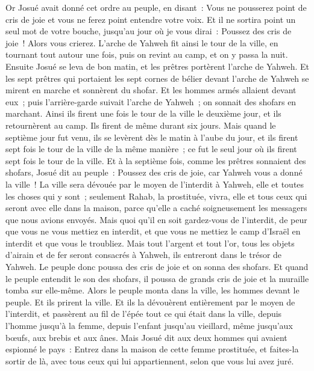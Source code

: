 \begin{multicols}{2}
Or Josué avait donné cet ordre au peuple, en disant~: Vous ne pousserez point de cris de joie et vous ne ferez point entendre votre voix. Et il ne sortira point un seul mot de votre bouche, jusqu'au jour où je vous dirai~: Poussez des cris de joie~! Alors vous crierez.
L'arche de Yahweh fit ainsi le tour de la ville, en tournant tout autour une fois, puis on revint au camp, et on y passa la nuit.
Ensuite Josué se leva de bon matin, et les prêtres portèrent l'arche de Yahweh.
Et les sept prêtres qui portaient les sept cornes de bélier devant l'arche de Yahweh se mirent en marche et sonnèrent du shofar. Et les hommes armés allaient devant eux~; puis l'arrière-garde suivait l'arche de Yahweh~; on sonnait des shofars en marchant.
Ainsi ils firent une fois le tour de la ville le deuxième jour, et ils retournèrent au camp. Ils firent de même durant six jours.
Mais quand le septième jour fut venu, ils se levèrent dès le matin à l'aube du jour, et ils firent sept fois le tour de la ville de la même manière~; ce fut le seul jour où ils firent sept fois le tour de la ville.
Et à la septième fois, comme les prêtres sonnaient des shofars, Josué dit au peuple~: Poussez des cris de joie, car Yahweh vous a donné la ville~!
La ville sera dévouée par le moyen de l'interdit à Yahweh, elle et toutes les choses qui y sont~; seulement Rahab, la prostituée, vivra, elle et tous ceux qui seront avec elle dans la maison, parce qu'elle a caché soigneusement les messagers que nous avions envoyés.
Mais quoi qu'il en soit gardez-vous de l'interdit, de peur que vous ne vous mettiez en interdit, et que vous ne mettiez le camp d'Israël en interdit et que vous le troubliez.
Mais tout l'argent et tout l'or, tous les objets d'airain et de fer seront consacrés à Yahweh, ils entreront dans le trésor de Yahweh.
Le peuple donc poussa des cris de joie et on sonna des shofars. Et quand le peuple entendit le son des shofars, il poussa de grands cris de joie et la muraille tomba sur elle-même. Alors le peuple monta dans la ville, les hommes devant le peuple. Et ils prirent la ville.
Et ils la dévouèrent entièrement par le moyen de l'interdit, et passèrent au fil de l'épée tout ce qui était dans la ville, depuis l'homme jusqu'à la femme, depuis l'enfant jusqu'au vieillard, même jusqu'aux bœufs, aux brebis et aux ânes.
Mais Josué dit aux deux hommes qui avaient espionné le pays~: Entrez dans la maison de cette femme prostituée, et faites-la sortir de là, avec tous ceux qui lui appartiennent, selon que vous lui avez juré.

\end{multicols}
